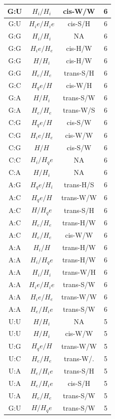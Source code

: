 \begin{center}
\begin{longtable}{c|c|c|c}
G:U & $H_i/H_i$ & cis-W/W & 6 \\  \hline
G:U & $H_ie/H_ie$ & cis-S/H & 6 \\  \hline
G:G & $H_i/H_i$ & NA & 6 \\  \hline
G:G & $H_ie/H_e$ & cis-H/W & 6 \\  \hline
G:G & $H/H_i$ & cis-H/W & 6 \\  \hline
G:G & $H_e/H_e$ & trans-S/H & 6 \\  \hline
G:C & $H_qe/H$ & cis-W/H & 6 \\  \hline
G:A & $H/H_i$ & trans-S/W & 6 \\  \hline
G:A & $H_e/H_e$ & trans-W/S & 6 \\  \hline
C:G & $H_qe/H$ & cis-S/W & 6 \\  \hline
C:G & $H_ie/H_e$ & cis-W/W & 6 \\  \hline
C:G & $H/H$ & cis-S/W & 6 \\  \hline
C:C & $H_i/H_qe$ & NA & 6 \\  \hline
C:A & $H/H_i$ & NA & 6 \\  \hline
A:G & $H_qe/H_i$ & trans-H/S & 6 \\  \hline
A:C & $H_qe/H$ & trans-W/W & 6 \\  \hline
A:C & $H/H_qe$ & trans-S/H & 6 \\  \hline
A:C & $H_e/H_e$ & trans-H/W & 6 \\  \hline
A:C & $H_e/H_e$ & cis-W/W & 6 \\  \hline
A:A & $H_i/H$ & trans-H/W & 6 \\  \hline
A:A & $H_i/H_qe$ & trans-H/W & 6 \\  \hline
A:A & $H_i/H_i$ & trans-W/H & 6 \\  \hline
A:A & $H_ie/H_ie$ & trans-S/W & 6 \\  \hline
A:A & $H_ie/H_e$ & trans-W/W & 6 \\  \hline
A:A & $H_e/H_ie$ & trans-S/W & 6 \\  \hline
U:U & $H/H_i$ & NA & 5 \\  \hline
U:U & $H/H_i$ & cis-W/W & 5 \\  \hline
U:G & $H_qe/H$ & trans-W/W & 5 \\  \hline
U:C & $H_e/H_e$ & trans-W/. & 5 \\  \hline
U:A & $H_e/H_ie$ & trans-S/H & 5 \\  \hline
U:A & $H_e/H_ie$ & cis-S/H & 5 \\  \hline
U:A & $H_e/H_e$ & trans-S/W & 5 \\  \hline
G:U & $H/H_qe$ & trans-S/W & 5 \\  \hline

\end{longtable}
\end{center}
